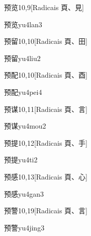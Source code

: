 \begin{entry}{预览}{10,9}[Radicais ⾴、⾒]
  \begin{phonetics}{预览}{yu4lan3}
  \end{phonetics}
\end{entry}

\begin{entry}{预留}{10,10}[Radicais ⾴、⽥]
  \begin{phonetics}{预留}{yu4liu2}
  \end{phonetics}
\end{entry}

\begin{entry}{预配}{10,10}[Radicais ⾴、⾣]
  \begin{phonetics}{预配}{yu4pei4}
  \end{phonetics}
\end{entry}

\begin{entry}{预谋}{10,11}[Radicais ⾴、⾔]
  \begin{phonetics}{预谋}{yu4mou2}
  \end{phonetics}
\end{entry}

\begin{entry}{预提}{10,12}[Radicais ⾴、⼿]
  \begin{phonetics}{预提}{yu4ti2}
  \end{phonetics}
\end{entry}

\begin{entry}{预感}{10,13}[Radicais ⾴、⼼]
  \begin{phonetics}{预感}{yu4gan3}
  \end{phonetics}
\end{entry}

\begin{entry}{预警}{10,19}[Radicais ⾴、⾔]
  \begin{phonetics}{预警}{yu4jing3}
  \end{phonetics}
\end{entry}

